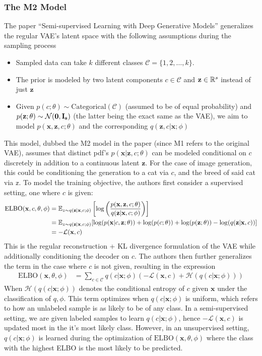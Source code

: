 \subsubsection{The M2 Model}
The paper ``Semi-supervised Learning with Deep Generative Models'' \cite{m2} generalizes the regular VAE's latent space with the following assumptions during the sampling process
\begin{itemize}
    \item Sampled data can take $k$ different classes $\mathcal{C}=\{1,2,\dots,k\}$.
    \item The prior is modeled by two latent components $c\in\mathcal{C}$ and $\mathbf{z}\in\mathbb{R}^s$ instead of just $\mathbf{z}$
    \item Given $p(c;\theta)\sim\text{Categorical}(\mathcal{C})$ (assumed to be of equal probability) and $p(\mathbf{z};\theta)\sim\mathcal{N}(\mathbf{0},\mathbf{I_s})$ (the latter being the exact same as the VAE), we aim to model $p(\mathbf{x},\mathbf{z},c;\theta)$ and the corresponding $q(\mathbf{z},c|\mathbf{x};\phi)$
\end{itemize}
This model, dubbed the M2 model in the paper (since M1 refers to the original VAE), assumes that distinct pdf's $p(\mathbf{x}|\mathbf{z},c;\theta)$ can be modeled conditional on $c$ discretely in addition to a continuous latent $\mathbf{z}$. For the case of image generation, this could be conditioning the generation to a cat via $c$, and the breed of said cat via $\mathbb{z}$. To model the training objective, the authors first consider a supervised setting, one where $c$ is given:
\begin{align*}
    \text{ELBO}(\mathbf{x},c,\theta,\phi)
    &= \mathbb{E}_{z\sim q(\mathbf{z}|\mathbf{x},c;\phi)}\left[\log\left(\frac{p(\mathbf{x},\mathbf{z},c;\theta)}{q(\mathbf{z}|\mathbf{x},c;\phi)}\right)\right] \\
    &= \mathbb{E}_{z\sim q(\mathbf{z}|\mathbf{x},c;\phi)} [\log(p(\mathbf{x}|c,\mathbf{z};\theta))+\log(p(c;\theta))+\log(p(\mathbf{z};\theta))-\log(q(\mathbf{z}|\mathbf{x},c))]\\
    &= -\mathcal{L}(\mathbf{x},c)
\end{align*}
This is the regular reconstruction + KL divergence formulation of the VAE while additionally conditioning the decoder on $c$. The authors then further generalizes the term in the case where $c$ is not given, resulting in the expression
\begin{align*}
    \text{ELBO}(\mathbf{x},\theta,\phi)
    &= \sum_{c\in\mathcal{C}} q(c|\mathbf{x};\phi) (-\mathcal{L}(\mathbf{x},c) + \mathcal{H}(q(c|\mathbf{x};\phi)) )
\end{align*}
When $\mathcal{H}(q(c|\mathbf{x};\phi))$ denotes the conditional entropy of $c$ given $\mathbf{x}$ under the classification of $q,\phi$. This term optimizes when $q(c|\mathbf{x};\phi)$ is uniform, which refers to how an unlabeled sample is as likely to be of any class. In a semi-supervised setting, we are given labeled samples to learn $q(c|\mathbf{x};\phi)$, hence $-\mathcal{L}(\mathbf{x},c)$ is updated most in the it's most likely class. However, in an unsupervised setting, $q(c|\mathbf{x};\phi)$ is learned during the optimization of $\text{ELBO}(\mathbf{x},\theta,\phi)$ where the class with the highest ELBO is the most likely to be predicted. 
